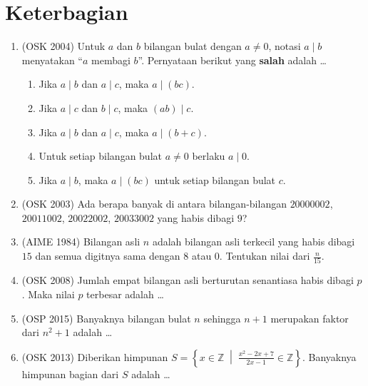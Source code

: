 \documentclass[12pt]{scrartcl}
\begin{document}
\section{Keterbagian}
\begin{enumerate}

	\item (OSK 2004)
	Untuk $a$ dan $b$ bilangan bulat dengan $a \ne 0$, notasi $a \mid b$ menyatakan
	``$a$ membagi $b$''. Pernyataan berikut yang \textbf{salah} adalah \dots
	\begin{enumerate}
		\item Jika $a \mid b$ dan $a \mid c$, maka $a \mid (bc)$.
		\item Jika $a \mid c$ dan $b \mid c$, maka $(ab) \mid c$.
		\item Jika $a \mid b$ dan $a \mid c$, maka $a \mid (b + c)$.
		\item Untuk setiap bilangan bulat $a \ne 0$ berlaku $a \mid 0$.
		\item Jika $a \mid b$, maka $a \mid (bc)$ untuk setiap bilangan bulat $c$.
	\end{enumerate}

	\item (OSK 2003)
	Ada berapa banyak di antara bilangan-bilangan $20000002$, $20011002$,
	$20022002$, $20033002$ yang habis dibagi $9$?

	\item (AIME 1984)
	Bilangan asli $n$ adalah bilangan asli terkecil yang habis dibagi $15$
	dan semua digitnya sama dengan $8$ atau $0$. Tentukan nilai dari $\frac{n}{15}$.

	\item (OSK 2008)
	Jumlah empat bilangan asli berturutan senantiasa habis dibagi $p$.
	Maka nilai $p$ terbesar adalah \dots

	\item (OSP 2015)
	Banyaknya bilangan bulat $n$ sehingga $n + 1$ merupakan faktor dari $n^2 + 1$ adalah \dots

	\item (OSK 2013)
	Diberikan himpunan $S = \left\{x \in \mathbb{Z} \;\middle|\; \frac{x^2 - 2x + 7}{2x - 1} \in \mathbb{Z}\right\}$.
	Banyaknya himpunan bagian dari $S$ adalah \dots


\end{enumerate}
\end{document}
